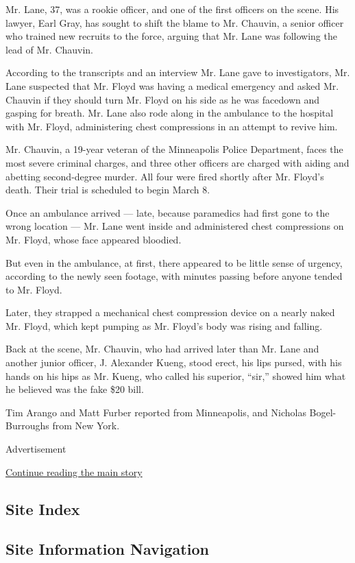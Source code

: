 Mr. Lane, 37, was a rookie officer, and one of the first officers on the
scene. His lawyer, Earl Gray, has sought to shift the blame to Mr.
Chauvin, a senior officer who trained new recruits to the force, arguing
that Mr. Lane was following the lead of Mr. Chauvin.

According to the transcripts and an interview Mr. Lane gave to
investigators, Mr. Lane suspected that Mr. Floyd was having a medical
emergency and asked Mr. Chauvin if they should turn Mr. Floyd on his
side as he was facedown and gasping for breath. Mr. Lane also rode along
in the ambulance to the hospital with Mr. Floyd, administering chest
compressions in an attempt to revive him.

Mr. Chauvin, a 19-year veteran of the Minneapolis Police Department,
faces the most severe criminal charges, and three other officers are
charged with aiding and abetting second-degree murder. All four were
fired shortly after Mr. Floyd's death. Their trial is scheduled to begin
March 8.

Once an ambulance arrived --- late, because paramedics had first gone to
the wrong location --- Mr. Lane went inside and administered chest
compressions on Mr. Floyd, whose face appeared bloodied.

But even in the ambulance, at first, there appeared to be little sense
of urgency, according to the newly seen footage, with minutes passing
before anyone tended to Mr. Floyd.

Later, they strapped a mechanical chest compression device on a nearly
naked Mr. Floyd, which kept pumping as Mr. Floyd's body was rising and
falling.

Back at the scene, Mr. Chauvin, who had arrived later than Mr. Lane and
another junior officer, J. Alexander Kueng, stood erect, his lips
pursed, with his hands on his hips as Mr. Kueng, who called his
superior, ``sir,'' showed him what he believed was the fake \$20 bill.

Tim Arango and Matt Furber reported from Minneapolis, and Nicholas
Bogel-Burroughs from New York.

Advertisement

\protect\hyperlink{after-bottom}{Continue reading the main story}

\hypertarget{site-index}{%
\subsection{Site Index}\label{site-index}}

\hypertarget{site-information-navigation}{%
\subsection{Site Information
Navigation}\label{site-information-navigation}}

